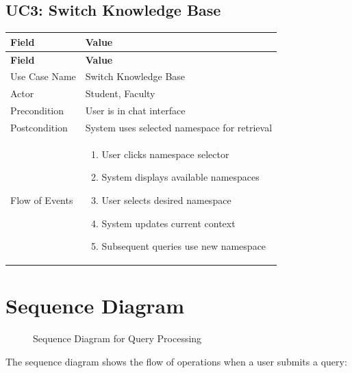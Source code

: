 \documentclass[12pt,a4paper]{book}
\numberwithin{table}{chapter}
\numberwithin{figure}{chapter}
\numberwithin{equation}{chapter}
\begin{document}
\subsection{UC3: Switch Knowledge Base}

\begin{longtable}{|p{1.5in}|p{4in}|}
\hline
\textbf{Field} & \textbf{Value}\\
\hline
\endfirsthead
\hline
\textbf{Field} & \textbf{Value}\\
\hline
\endhead
\hline
Use Case Name & Switch Knowledge Base\\
\hline
Actor & Student, Faculty\\
\hline
Precondition & User is in chat interface\\
\hline
Postcondition & System uses selected namespace for retrieval\\
\hline
Flow of Events &
\begin{enumerate}
    \item User clicks namespace selector
    \item System displays available namespaces
    \item User selects desired namespace
    \item System updates current context
    \item Subsequent queries use new namespace
\end{enumerate}\\
\hline
\end{longtable}

\section{Sequence Diagram}

\begin{figure}[h]
\caption{Sequence Diagram for Query Processing}
\label{fig:sequence}
\end{figure}

The sequence diagram shows the flow of operations when a user submits a query:
\end{document}
